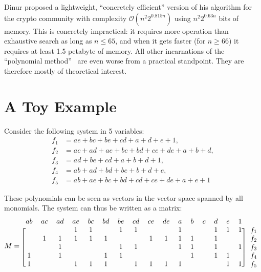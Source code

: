 \documentclass[a4paper,UKenglish,cleveref, autoref]{lipics-v2019}
\newcommand{\bigO}[1]{\ensuremath{\mathcal{O}\left( #1 \right)} }
\begin{document}
Dinur proposed a lightweight, ``concretely efficient'' version of his algorithm
for the crypto community with complexity $\bigO{n^2 2^{0.815n}}$ using
$n^2 2^{0.63n}$ bits of memory. This is concretely impractical: it requires more
operation than exhaustive search as long as $n \leq 65$, and when it gets faster
(for $n \geq 66$) it requires at least 1.5 petabyte of memory. All other
incarnations of the ``polynomial
method''~\cite{LokshtanovPTWY17,BjorklundK019,Dinur21} are even worse from a
practical standpoint.  They are therefore mostly of theoretical interest.


\section{A Toy Example}

Consider the following system in 5 variables:
\begin{align*}
  f_1 &= ae + bc + be + cd + a + d + e + 1,\\
  f_2 &= ac + ad + ae + bc + bd + ce + de + a + b + d,\\
  f_3 &= ad + be + cd  + a + b + d + 1,\\
  f_4 &= ab + ad + bd + be + b + d + e,\\            
  f_5 &= ab + ae + bc + bd + cd + ce + de + a + e + 1
\end{align*}



These polynomials can be seen as vectors in the vector space spanned by all
monomials. The system can thus be written as a matrix:
\[
  M = \begin{blockarray}{ccccccccccccccccc}
  ab & ac & ad & ae & bc & bd & be & cd & ce & de & a & b & c & d & e & 1 & \\
  \begin{block}{[cccccccccccccccc]c}
     &    &    & 1  & 1  &    & 1  & 1  &    &    & 1 &   &   & 1 & 1 & 1 & f_1\\
     & 1  & 1  & 1  & 1  & 1  &    &    & 1  & 1  & 1 & 1 &   & 1 &   &   & f_2 \\
     &    & 1  &    &    &    & 1  & 1  &    &    & 1 & 1 &   & 1 &   & 1 & f_3 \\
   1 &    & 1  &    &    & 1  & 1  &    &    &    &   & 1 &   & 1 & 1 &   & f_4 \\
   1 &    &    & 1  & 1  & 1  &    & 1  & 1  & 1  & 1 &   &   &   & 1 & 1 & f_5 \\
    \end{block}
\end{blockarray}
\]
\end{document}
